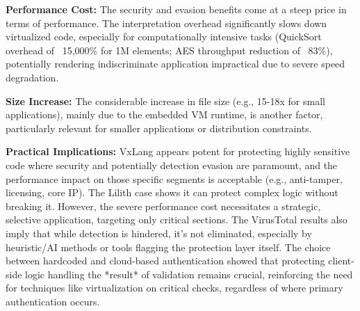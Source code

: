 \textbf{Performance Cost:} The security and evasion benefits come at a steep price in terms of performance. The interpretation overhead significantly slows down virtualized code, especially for computationally intensive tasks (QuickSort overhead of ~15,000\% for 1M elements; AES throughput reduction of ~83\%), potentially rendering indiscriminate application impractical due to severe speed degradation.

\textbf{Size Increase:} The considerable increase in file size (e.g., 15-18x for small applications), mainly due to the embedded VM runtime, is another factor, particularly relevant for smaller applications or distribution constraints.

\textbf{Practical Implications:} VxLang appears potent for protecting highly sensitive code where security and potentially detection evasion are paramount, and the performance impact on those specific segments is acceptable (e.g., anti-tamper, licensing, core IP). The Lilith case shows it can protect complex logic without breaking it. However, the severe performance cost necessitates a strategic, selective application, targeting only critical sections. The VirusTotal results also imply that while detection is hindered, it's not eliminated, especially by heuristic/AI methods or tools flagging the protection layer itself. The choice between hardcoded and cloud-based authentication showed that protecting client-side logic handling the *result* of validation remains crucial, reinforcing the need for techniques like virtualization on critical checks, regardless of where primary authentication occurs.
